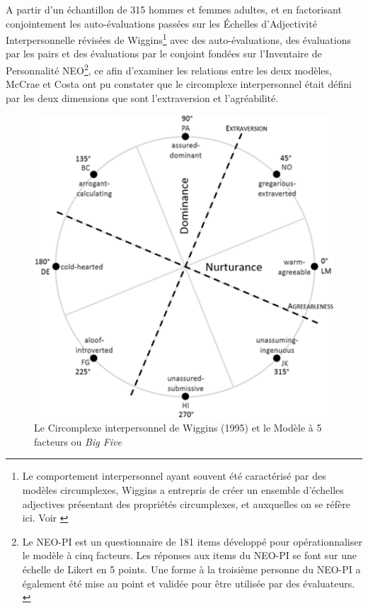 A partir d’un échantillon de 315 hommes et femmes adultes, et en factorisant conjointement les auto-évaluations passées sur les Échelles d'Adjectivité Interpersonnelle révisées de Wiggins\footnote{Le comportement interpersonnel ayant souvent été caractérisé par des modèles circumplexes, Wiggins a entrepris de créer un ensemble d'échelles adjectives présentant des propriétés circumplexes, et auxquelles on se réfère ici. Voir \cite{wiggins_psychological_1979}} avec des auto-évaluations, des évaluations par les pairs et des évaluations par le conjoint fondées sur l'Inventaire de Personnalité NEO\footnote{Le NEO-PI est un questionnaire de 181 items développé pour opérationnaliser le modèle à cinq facteurs. Les réponses aux items du NEO-PI se font sur une échelle de Likert en 5 points. Une forme à la troisième personne du NEO-PI a également été mise au point et validée pour être utilisée par des évaluateurs. \cite{costa 1985}}, ce afin d'examiner les relations entre les deux modèles, McCrae et Costa\cite{mccrae_structure_1989} ont pu constater que le circomplexe interpersonnel était défini par les deux dimensions que sont l'extraversion et l'agréabilité.

\begin{figure}[!ht]
    \centering
    \includegraphics[width=12cm]{img/circumplex_wiggins.png}
    \caption{Le Circomplexe interpersonnel de Wiggins (1995) et le Modèle à 5 facteurs ou \textit{Big Five}}
    \label{circumplex_wiggins}
\end{figure}
\newpage


